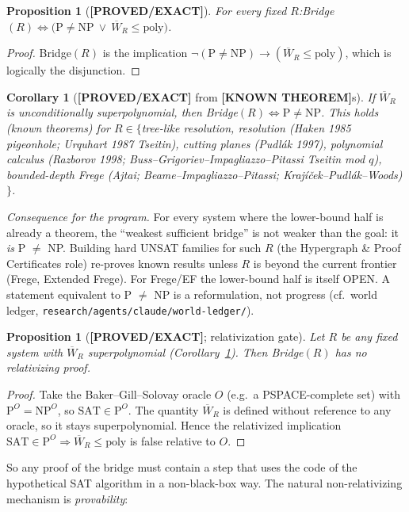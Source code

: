 \documentclass[11pt]{article}
\newtheorem{proposition}[theorem]{Proposition}
\newtheorem{corollary}[theorem]{Corollary}
\theoremstyle{remark}
\newcommand{\SAT}{\mathrm{SAT}}
\newcommand{\Wbar}{\overline{W}}
\newcommand{\status}[1]{\textbf{[#1]}}
\begin{document}
\begin{proposition}[\status{PROVED/EXACT}]\label{prop:eq}
For every fixed $R$:\quad Bridge$(R)\iff\bigl(\mathrm{P}\neq\mathrm{NP}\ \vee\ \Wbar_R\le\mathrm{poly}\bigr)$.
\end{proposition}
\begin{proof}
Bridge$(R)$ is the implication $\neg(\mathrm{P}\ne\mathrm{NP})\to(\Wbar_R\le\mathrm{poly})$,
which is logically the disjunction.
\end{proof}

\begin{corollary}[\status{PROVED/EXACT} from \status{KNOWN THEOREM}s]\label{cor:weak}
If $\Wbar_R$ is unconditionally superpolynomial, then Bridge$(R)\iff\mathrm{P}\neq\mathrm{NP}$.
This holds (known theorems) for $R\in\{$tree-like resolution, resolution (Haken 1985 pigeonhole;
Urquhart 1987 Tseitin), cutting planes (Pudl\'ak 1997), polynomial calculus (Razborov 1998;
Buss--Grigoriev--Impagliazzo--Pitassi Tseitin mod $q$), bounded-depth Frege (Ajtai; Beame--Impagliazzo--Pitassi; Kraj\'i\v{c}ek--Pudl\'ak--Woods)$\}$.
\end{corollary}

\noindent\emph{Consequence for the program.} For every system where the lower-bound half is
already a theorem, the ``weakest sufficient bridge'' is not weaker than the goal: it
\emph{is} P $\neq$ NP. Building hard UNSAT families for such $R$ (the Hypergraph \&
Proof Certificates role) re-proves known results unless $R$ is beyond the current frontier
(Frege, Extended Frege). For Frege/EF the lower-bound half is itself OPEN.
A statement equivalent to P $\neq$ NP is a reformulation, not progress
(cf.\ world ledger, \texttt{research/agents/claude/world-ledger/}).

\begin{proposition}[\status{PROVED/EXACT}; relativization gate]\label{prop:rel}
Let $R$ be any fixed system with $\Wbar_R$ superpolynomial (Corollary~\ref{cor:weak}).
Then Bridge$(R)$ has no relativizing proof.
\end{proposition}
\begin{proof}
Take the Baker--Gill--Solovay oracle $O$ (e.g.\ a PSPACE-complete set) with
$\mathrm{P}^O=\mathrm{NP}^O$, so $\SAT\in\mathrm{P}^O$. The quantity $\Wbar_R$ is
defined without reference to any oracle, so it stays superpolynomial. Hence the relativized
implication $\SAT\in\mathrm{P}^O\Rightarrow\Wbar_R\le\mathrm{poly}$ is false relative to $O$.
\end{proof}
\noindent So any proof of the bridge must contain a step that uses the code of the
hypothetical SAT algorithm in a non-black-box way. The natural non-relativizing
mechanism is \emph{provability}:
\end{document}
